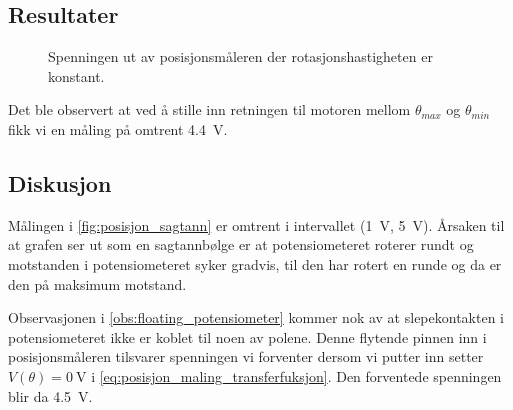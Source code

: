 \subsection{Resultater}

\begin{figure}[h]
    \centering
    
    \caption{Spenningen ut av posisjonsmåleren der rotasjonshastigheten er konstant.}
    \label{fig:posisjon_sagtann}
\end{figure}

\label{obs:floating_potensiometer}
Det ble observert at ved å stille inn retningen til motoren mellom $\theta_{max}$ og $\theta_{min}$ fikk vi en måling på omtrent \SI{4.4}{\volt}.








\subsection{Diskusjon}

Målingen i \autoref{fig:posisjon_sagtann} er omtrent i intervallet (\SI{1}{\volt}, \SI{5}{\volt}). Årsaken til at grafen ser ut som en sagtannbølge er at potensiometeret roterer rundt og motstanden i potensiometeret syker gradvis, til den har rotert en runde og da er den på maksimum motstand.

Observasjonen i \ref{obs:floating_potensiometer} kommer nok av at slepekontakten i potensiometeret ikke er koblet til noen av polene. Denne flytende pinnen inn i posisjonsmåleren tilsvarer spenningen vi forventer dersom vi putter inn setter $V(\theta) = \SI{0}{\volt}$ i \autoref{eq:posisjon_maling_transferfuksjon}. Den forventede spenningen blir da \SI{4.5}{\volt}.